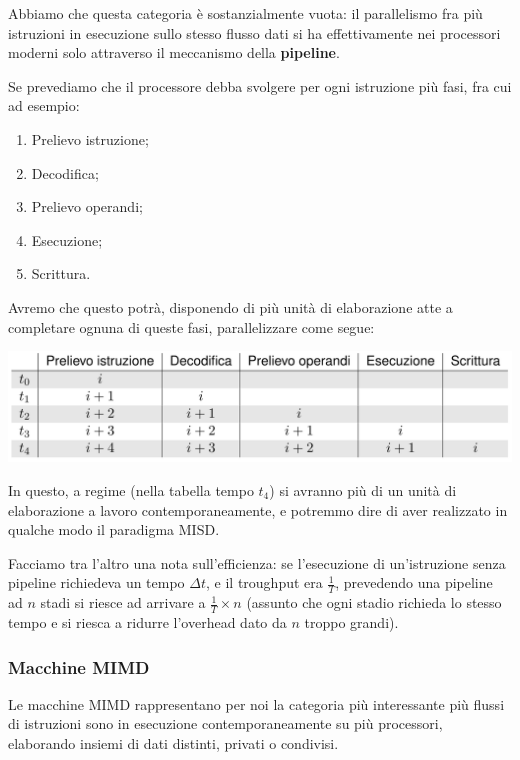 \documentclass[a4paper,11pt]{article}
\begin{document}
Abbiamo che questa categoria è sostanzialmente vuota: il parallelismo fra più istruzioni in esecuzione sullo stesso flusso dati si ha effettivamente nei processori moderni solo attraverso il meccanismo della \textbf{pipeline}.

Se prevediamo che il processore debba svolgere per ogni istruzione più fasi, fra cui ad esempio:
\begin{enumerate}
	\item Prelievo istruzione;
	\item Decodifica;
	\item Prelievo operandi;
	\item Esecuzione;
	\item Scrittura.
\end{enumerate}
Avremo che questo potrà, disponendo di più unità di elaborazione atte a completare ognuna di queste fasi, parallelizzare come segue:
\begin{center}
	\includegraphics[scale=0.3]{../figures/pipeline.png}
\end{center}

In questo, a regime (nella tabella tempo $t_4$) si avranno più di un unità di elaborazione a lavoro contemporaneamente, e potremmo dire di aver realizzato in qualche modo il paradigma MISD.

Facciamo tra l'altro una nota sull'efficienza: se l'esecuzione di un'istruzione senza pipeline richiedeva un tempo $\Delta t$, e il troughput era $\frac{1}{T}$, prevedendo una pipeline ad $n$ stadi si riesce ad arrivare a $\frac{1}{T} \times n$ (assunto che ogni stadio richieda lo stesso tempo e si riesca a ridurre l'overhead dato da $n$ troppo grandi).

\subsubsection{Macchine MIMD}
Le macchine MIMD rappresentano per noi la categoria più interessante più flussi di istruzioni sono in esecuzione contemporaneamente su più processori, elaborando insiemi di dati distinti, privati o condivisi.
\end{document}
